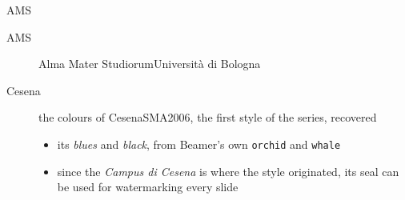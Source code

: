 \begin{frame}[c]{AMS}
%
\begin{description}
	\item[AMS] Alma Mater Studiorum\textendash{}Università di Bologna
	\item[Cesena] the colours of \alert{CesenaSMA2006}, the first style of the series, recovered
	\begin{itemize}
		\item its \textcolor{owblue}{\textit{blues}} and \textcolor{owblack}{\textit{black}}, from Beamer's own \texttt{orchid} and \texttt{whale}
		\item since the \emph{Campus di Cesena} is where the style originated, its seal can be used for watermarking every slide
	\end{itemize}
\end{description}
%
\end{frame}
